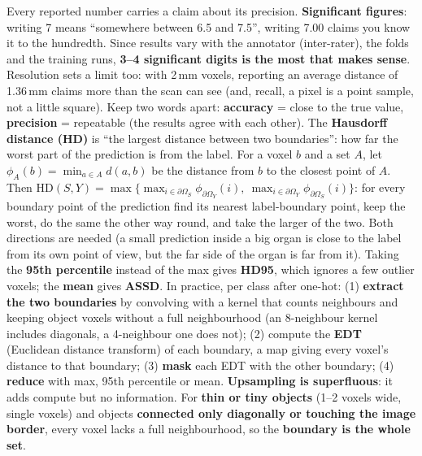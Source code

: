 \documentclass[a4paper]{article}
\newcommand{\K}[1]{\textcolor{kg}{\textbf{#1}}}
\newcommand{\F}[1]{\textcolor{fb}{#1}}
\newcommand{\E}[1]{\textcolor{ep}{#1}}
\newcommand{\T}[1]{\textcolor{tr}{\textbf{#1}}}
\newcommand{\Om}{\Omega}
\begin{document}
Every reported number carries a claim about its precision. \K{Significant figures}: writing \E{7} means ``somewhere between 6.5 and 7.5'', writing \E{7.00} claims you know it to the hundredth. Since results vary with the annotator (inter-rater), the folds and the training runs, \T{3--4 significant digits is the most that makes sense}. Resolution sets a limit too: \E{with 2\,mm voxels, reporting an average distance of 1.36\,mm claims more than the scan can see} (and, recall, a pixel is a point sample, not a little square). Keep two words apart: \K{accuracy} = close to the true value, \K{precision} = repeatable (the results agree with each other).
The \K{Hausdorff distance (HD)} is ``the largest distance between two boundaries'': how far the worst part of the prediction is from the label. For a voxel $b$ and a set $A$, let \F{$\phi_A(b)=\min_{a\in A}d(a,b)$} be the distance from $b$ to the closest point of $A$. Then \F{$\text{HD}(S,Y)=\max\{\max_{i\in\partial\Om_S}\phi_{\partial\Om_Y}(i),\ \max_{i\in\partial\Om_Y}\phi_{\partial\Om_S}(i)\}$}: for every boundary point of the prediction find its nearest label-boundary point, keep the worst, do the same the other way round, and take the larger of the two. Both directions are needed (\E{a small prediction inside a big organ is close to the label from its own point of view, but the far side of the organ is far from it}). Taking the \K{95th percentile} instead of the max gives \K{HD95}, which ignores a few outlier voxels; the \K{mean} gives \K{ASSD}. In practice, per class after one-hot: (1) \K{extract the two boundaries} by convolving with a kernel that counts neighbours and keeping object voxels without a full neighbourhood (an 8-neighbour kernel includes diagonals, a 4-neighbour one does not); (2) compute the \K{EDT} (Euclidean distance transform) of each boundary, a map giving every voxel's distance to that boundary; (3) \K{mask} each EDT with the other boundary; (4) \K{reduce} with max, 95th percentile or mean. \T{Upsampling is superfluous}: it adds compute but no information.
For \T{thin or tiny objects} (1--2 voxels wide, single voxels) and objects \T{connected only diagonally or touching the image border}, every voxel lacks a full neighbourhood, so the \K{boundary is the whole set}.
\end{document}
